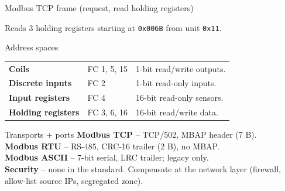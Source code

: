 \documentclass[10pt,a4paper,landscape]{article}
\begin{document}
\begin{minipage}[t]{0.49\linewidth}
\begin{panel}{Modbus TCP frame (request, read holding registers)}
\centering
{}
\par\vspace{2mm}
{\footnotesize Reads 3 holding registers starting at \texttt{0x006B} from unit \texttt{0x11}.}
\end{panel}

\vspace{2mm}
\begin{panel}{Address spaces}
\small
\begin{tabular}{p{2.0cm} p{2.8cm} p{6.3cm}}
\textbf{Coils}            & FC 1, 5, 15  & 1-bit read/write outputs. \\
\textbf{Discrete inputs}  & FC 2         & 1-bit read-only inputs. \\
\textbf{Input registers}  & FC 4         & 16-bit read-only sensors. \\
\textbf{Holding registers}& FC 3, 6, 16  & 16-bit read/write data. \\
\end{tabular}
\end{panel}

\vspace{2mm}
\begin{panel}{Transports + ports}
\small
\textbf{Modbus TCP} -- TCP/502, MBAP header (7 B).\\
\textbf{Modbus RTU} -- RS-485, CRC-16 trailer (2 B), no MBAP.\\
\textbf{Modbus ASCII} -- 7-bit serial, LRC trailer; legacy only.\\
\textbf{Security} -- none in the standard. Compensate at the network layer (firewall, allow-list source IPs, segregated zone).
\end{panel}
\end{minipage}
\end{document}

